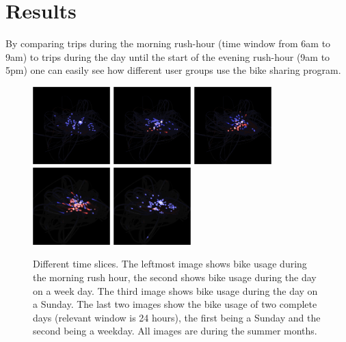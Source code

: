 \section{Results}
\label{sec:result}
By comparing trips during the morning rush-hour (time window from
6am to 9am) to trips during the day until the start of
the evening rush-hour (9am to 5pm) one can easily see
how different user groups use the bike sharing program.

\begin{figure}
\centering
\includegraphics[width=3cm]{images/rush_7_tue.png}
\hspace*{0.5cm}
\includegraphics[width=3cm]{images/day_7_fri.png}
\hspace*{0.5cm}
\includegraphics[width=3cm]{images/day_7_sun.png}
\hspace*{0.5cm}
\includegraphics[width=3cm]{images/full_10_sun.png}
\hspace*{0.5cm}
\includegraphics[width=3cm]{images/full_10_wed.png}
\caption{Different time slices. The leftmost image shows
bike usage during the morning rush hour, the second shows
bike usage during the day on a week day. The third image
shows bike usage during the day on a Sunday.
The last two images show the bike usage of two complete
days (relevant window is 24 hours), the first being a Sunday
and the second being a weekday. All images are during the summer months.}
\label{fig:smallm}
\end{figure}
